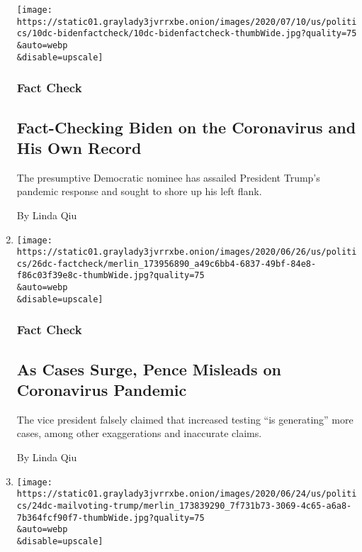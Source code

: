 \begin{enumerate}
  \texttt{[image: https://static01.graylady3jvrrxbe.onion/images/2020/07/10/us/politics/10dc-bidenfactcheck/10dc-bidenfactcheck-thumbWide.jpg?quality=75\\\&auto=webp\\\&disable=upscale]}

  \hypertarget{fact-check-3}{%
  \subsubsection{Fact Check}\label{fact-check-3}}

  \hypertarget{fact-checking-biden-on-the-coronavirus-and-his-own-record}{%
  \subsection{Fact-Checking Biden on the Coronavirus and His Own
  Record}\label{fact-checking-biden-on-the-coronavirus-and-his-own-record}}

  The presumptive Democratic nominee has assailed President Trump's
  pandemic response and sought to shore up his left flank.

  By Linda Qiu
\item
  \href{/2020/06/26/us/politics/coronavirus-pence-fact-check.html}{}

  \texttt{[image: https://static01.graylady3jvrrxbe.onion/images/2020/06/26/us/politics/26dc-factcheck/merlin\_173956890\_a49c6bb4-6837-49bf-84e8-f86c03f39e8c-thumbWide.jpg?quality=75\\\&auto=webp\\\&disable=upscale]}

  \hypertarget{fact-check-4}{%
  \subsubsection{Fact Check}\label{fact-check-4}}

  \hypertarget{as-cases-surge-pence-misleads-on-coronavirus-pandemic}{%
  \subsection{As Cases Surge, Pence Misleads on Coronavirus
  Pandemic}\label{as-cases-surge-pence-misleads-on-coronavirus-pandemic}}

  The vice president falsely claimed that increased testing ``is
  generating'' more cases, among other exaggerations and inaccurate
  claims.

  By Linda Qiu
\item
  \href{/2020/06/24/us/politics/trump-vote-by-mail.html}{}

  \texttt{[image: https://static01.graylady3jvrrxbe.onion/images/2020/06/24/us/politics/24dc-mailvoting-trump/merlin\_173839290\_7f731b73-3069-4c65-a6a8-7b364fcf90f7-thumbWide.jpg?quality=75\\\&auto=webp\\\&disable=upscale]}


\end{enumerate}
